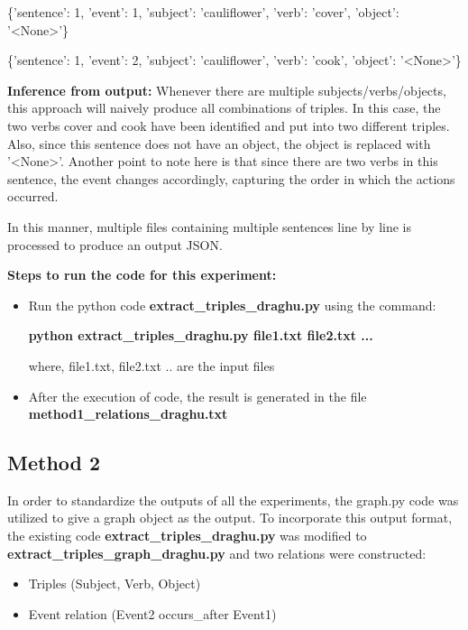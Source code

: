 \documentclass[11pt,letterpaper]{article}
\begin{document}
\begin{enumerate}
    \{'sentence': 1, 'event': 1, 'subject': 'cauliflower', 'verb': 'cover', 'object': '<None>'\}
    
    \{'sentence': 1, 'event': 2, 'subject': 'cauliflower', 'verb': 'cook', 'object': '<None>'\}
    
    \textbf{Inference from output:} 
    Whenever there are multiple subjects/verbs/objects, this approach will naively produce all combinations of triples. In this case, the two verbs cover and cook have been identified and put into two different triples. Also, since this sentence does not have an object, the object is replaced with '<None>'. Another point to note here is that since there are two verbs in this sentence, the event changes accordingly, capturing the order in which the actions occurred.

\end{enumerate}

\noindent
In this manner, multiple files containing multiple sentences line by line is processed to produce an output JSON. 

\noindent \newline
\textbf{Steps to run the code for this experiment:}
\begin{itemize}
    \item Run the python code \textbf{extract\_triples\_draghu.py} using the command:
    
    \textbf{python extract\_triples\_draghu.py file1.txt file2.txt ...}
    
    where, file1.txt, file2.txt .. are the input files
    
    \item After the execution of code, the result is generated in the file \textbf{method1\_relations\_draghu.txt}
\end{itemize}

\subsection{Method 2}
\noindent
In order to standardize the outputs of all the experiments, the graph.py code was utilized to give a graph object as the output. To incorporate this output format, the existing code \textbf{extract\_triples\_draghu.py} was modified to \textbf{extract\_triples\_graph\_draghu.py} and two relations were constructed:

\begin{itemize}
    \item Triples (Subject, Verb, Object)
    \item Event relation (Event2 occurs\_after Event1)
\end{itemize}
\end{document}
